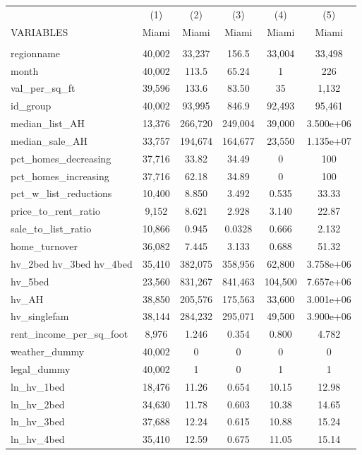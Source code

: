 \begin{tabular}{lccccc} \hline
 & (1) & (2) & (3) & (4) & (5) \\
VARIABLES & Miami & Miami & Miami & Miami & Miami \\ \hline
 &  &  &  &  &  \\
regionname & 40,002 & 33,237 & 156.5 & 33,004 & 33,498 \\
month & 40,002 & 113.5 & 65.24 & 1 & 226 \\
val\_per\_sq\_ft & 39,596 & 133.6 & 83.50 & 35 & 1,132 \\
id\_group & 40,002 & 93,995 & 846.9 & 92,493 & 95,461 \\
median\_list\_AH & 13,376 & 266,720 & 249,004 & 39,000 & 3.500e+06 \\
median\_sale\_AH & 33,757 & 194,674 & 164,677 & 23,550 & 1.135e+07 \\
pct\_homes\_decreasing & 37,716 & 33.82 & 34.49 & 0 & 100 \\
pct\_homes\_increasing & 37,716 & 62.18 & 34.89 & 0 & 100 \\
pct\_w\_list\_reductions & 10,400 & 8.850 & 3.492 & 0.535 & 33.33 \\
price\_to\_rent\_ratio & 9,152 & 8.621 & 2.928 & 3.140 & 22.87 \\
sale\_to\_list\_ratio & 10,866 & 0.945 & 0.0328 & 0.666 & 2.132 \\
home\_turnover & 36,082 & 7.445 & 3.133 & 0.688 & 51.32 \\
hv\_2bed 
hv\_3bed 
hv\_4bed & 35,410 & 382,075 & 358,956 & 62,800 & 3.758e+06 \\
hv\_5bed & 23,560 & 831,267 & 841,463 & 104,500 & 7.657e+06 \\
hv\_AH & 38,850 & 205,576 & 175,563 & 33,600 & 3.001e+06 \\
hv\_singlefam & 38,144 & 284,232 & 295,071 & 49,500 & 3.900e+06 \\
rent\_income\_per\_sq\_foot & 8,976 & 1.246 & 0.354 & 0.800 & 4.782 \\
weather\_dummy & 40,002 & 0 & 0 & 0 & 0 \\
legal\_dummy & 40,002 & 1 & 0 & 1 & 1 \\
ln\_hv\_1bed & 18,476 & 11.26 & 0.654 & 10.15 & 12.98 \\
ln\_hv\_2bed & 34,630 & 11.78 & 0.603 & 10.38 & 14.65 \\
ln\_hv\_3bed & 37,688 & 12.24 & 0.615 & 10.88 & 15.24 \\
ln\_hv\_4bed & 35,410 & 12.59 & 0.675 & 11.05 & 15.14 \\

\end{tabular}
